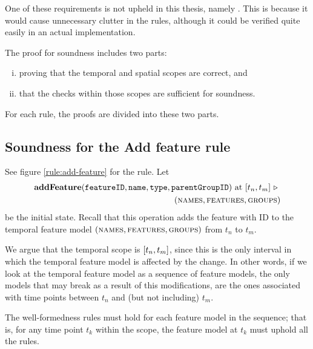 One of these requirements is not upheld in this thesis, namely . This is because it would cause unnecessary clutter in the rules, although it could be verified quite easily in an actual implementation.

The proof for soundness includes two parts: 
\begin{enumerate}[(i)]
   \item proving that the temporal and spatial scopes are correct, and
   \item that the checks within those scopes are sufficient for soundness.
\end{enumerate}
For each rule, the proofs are divided into these two parts.

   

\subsection{Soundness for the Add feature rule}
\label{sub:soundness-for-the-add-feature-rule}

See figure \vref{rule:add-feature} for the  rule.
Let 
\begin{equation*}
   \begin{split}
      \textbf{addFeature}(\var{featureID}, \var{name}, \var{type}, \var{parentGroupID})\text{ at }\interval{t_n}{t_m}
      \shove \\
   (\names{}, \features{}, \groups{})
\end{split}
\end{equation*}
be the initial state. Recall that this operation adds the feature with ID  to the temporal feature model $(\textsc{names}{}, \textsc{features}{}, \textsc{groups}{}{})$ from $t_n$ to $t_m$.

We argue that the temporal scope is $\interval{t_n}{t_m}$, since this is the only interval in which the temporal feature model is affected by the change. In other words, if we look at the temporal feature model as a sequence of feature models, the only models that may break as a result of this modifications, are the ones associated with time points between $t_n$ and (but not including) $t_m$. 

The well-formedness rules must hold for each feature model in the sequence; that is, for any time point $t_k$ within the scope, the feature model at $t_k$ must uphold all the rules. 

